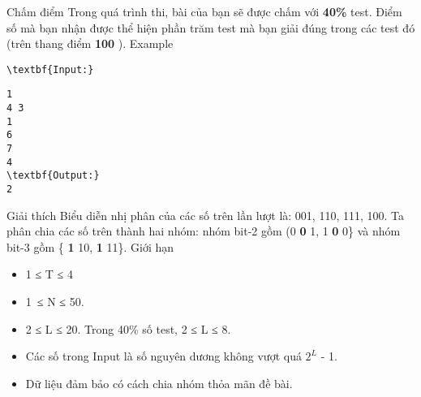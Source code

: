 Chấm điểm
Trong quá trình thi, bài của bạn sẽ được chấm với   \textbf{    40\%   }   test. Điểm số mà bạn nhận được thể hiện phần trăm test mà bạn giải đúng trong các test đó (trên thang điểm   \textbf{    100   }   ).
Example
\begin{verbatim}
\textbf{Input:}\end{verbatim}
\begin{verbatim}
1
4 3
1
6
7
4
\textbf{Output:}
2
\end{verbatim}
Giải thích
Biểu diễn nhị phân của các số trên lần lượt là: 001, 110, 111, 100. Ta phân chia các số trên thành hai nhóm: nhóm bit-2 gồm (0   \textbf{    0   }   1, 1   \textbf{    0   }   0\} và nhóm bit-3 gồm \{   \textbf{    1   }   10,   \textbf{    1   }   11\}.
Giới hạn
\begin{itemize}
	\item     1 ≤ T ≤ 4   
	\item     1 ≤ N ≤ 50.   
	\item     2 ≤ L ≤ 20. Trong 40\% số test, 2 ≤ L ≤ 8.   
	\item     Các số trong Input là số nguyên dương không vượt quá $2^{L}$    - 1.   
	\item     Dữ liệu đảm bảo có cách chia nhóm thỏa mãn đề bài.   
\end{itemize}